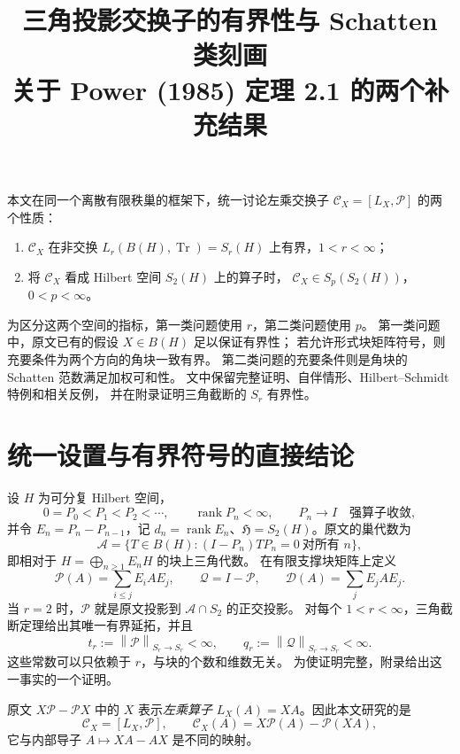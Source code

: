 \documentclass[UTF8,11pt,a4paper,fontset=fandol]{ctexart}
\title{三角投影交换子的有界性与 Schatten 类刻画\\
\large 关于 Power (1985) 定理 2.1 的两个补充结果}
\author{}
\date{}
\theoremstyle{remark}
\newcommand{\BH}{B(H)}
\newcommand{\Tr}{\operatorname{Tr}}
\newcommand{\PP}{\mathcal P}
\newcommand{\QQ}{\mathcal Q}
\newcommand{\DD}{\mathcal D}
\newcommand{\Alg}{\mathcal A}
\newcommand{\CC}{\mathcal C}
\newcommand{\norm}[1]{\left\lVert #1\right\rVert}
\DeclareMathOperator{\rank}{rank}
\newcommand{\HS}{\mathfrak H}
\numberwithin{equation}{section}
\begin{document}
\maketitle
\vspace{-2em}

本文在同一个离散有限秩巢的框架下，统一讨论左乘交换子
$\CC_X=[L_X,\PP]$ 的两个性质：
\begin{enumerate}[label=\textup{(\arabic*)}]
 \item $\CC_X$ 在非交换 $L_r(B(H),\Tr)=S_r(H)$ 上有界，$1<r<\infty$；
 \item 将 $\CC_X$ 看成 Hilbert 空间 $S_2(H)$ 上的算子时，
       $\CC_X\in S_p(S_2(H))$，$0<p<\infty$。
\end{enumerate}
为区分这两个空间的指标，第一类问题使用 $r$，第二类问题使用 $p$。
第一类问题中，原文已有的假设 $X\in B(H)$ 足以保证有界性；
若允许形式块矩阵符号，则充要条件为两个方向的角块一致有界。
第二类问题的充要条件则是角块的 Schatten 范数满足加权可和性。
文中保留完整证明、自伴情形、Hilbert--Schmidt 特例和相关反例，
并在附录证明三角截断的 $S_r$ 有界性。

\section{统一设置与有界符号的直接结论}

设 $H$ 为可分复 Hilbert 空间，
\[
 0=P_0<P_1<P_2<\cdots,\qquad \rank P_n<\infty,
 \qquad P_n\longrightarrow I\quad\text{强算子收敛},
\]
并令 $E_n=P_n-P_{n-1}$，记 $d_n=\rank E_n$、$\HS=S_2(H)$。原文的巢代数为
\[
 \Alg=\{T\in\BH:(I-P_n)TP_n=0\ \text{对所有 }n\},
\]
即相对于 $H=\bigoplus_{n\geq1}E_nH$ 的块上三角代数。
在有限支撑块矩阵上定义
\[
 \PP(A)=\sum_{i\leq j}E_iAE_j,\qquad
 \QQ=I-\PP,\qquad
 \DD(A)=\sum_jE_jAE_j.
\]
当 $r=2$ 时，$\PP$ 就是原文投影到 $\Alg\cap S_2$ 的正交投影。
对每个 $1<r<\infty$，三角截断定理给出其唯一有界延拓，并且
\begin{equation}\label{eq:tp}
 t_r:=\norm{\PP}_{S_r\to S_r}<\infty,\qquad
 q_r:=\norm{\QQ}_{S_r\to S_r}<\infty.
\end{equation}
这些常数可以只依赖于 $r$，与块的个数和维数无关。
为使证明完整，附录给出这一事实的一个证明。

\medskip
原文 $X\PP-\PP X$ 中的 $X$ 表示\emph{左乘算子}
$L_X(A)=XA$。因此本文研究的是
\begin{equation}\label{eq:defC}
 \CC_X=[L_X,\PP],\qquad
 \CC_X(A)=X\PP(A)-\PP(XA),
\end{equation}
它与内部导子 $A\mapsto XA-AX$ 是不同的映射。
\end{document}
